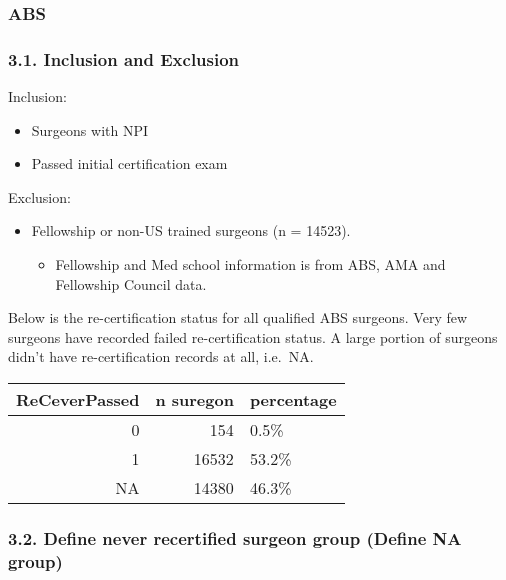 \documentclass[
]{article}
\providecommand{\tightlist}{%
  \setlength{\itemsep}{0pt}\setlength{\parskip}{0pt}}
\begin{document}
\hypertarget{abs}{%
\subsubsection{ABS}\label{abs}}

\hypertarget{inclusion-and-exclusion}{%
\subsubsection{3.1. Inclusion and
Exclusion}\label{inclusion-and-exclusion}}

Inclusion:

\begin{itemize}
\tightlist
\item
  Surgeons with NPI
\item
  Passed initial certification exam
\end{itemize}

Exclusion:

\begin{itemize}
\tightlist
\item
  Fellowship or non-US trained surgeons (n = 14523).

  \begin{itemize}
  \tightlist
  \item
    Fellowship and Med school information is from ABS, AMA and
    Fellowship Council data.
  \end{itemize}
\end{itemize}

Below is the re-certification status for all qualified ABS surgeons.
Very few surgeons have recorded failed re-certification status. A large
portion of surgeons didn't have re-certification records at all,
i.e.~NA.

\begin{table}[H]
\centering
\begin{tabular}{r|r|l}
\hline
ReCeverPassed & n suregon & percentage\\
\hline
0 & 154 & 0.5\%\\
\hline
1 & 16532 & 53.2\%\\
\hline
NA & 14380 & 46.3\%\\
\hline
\end{tabular}
\end{table}

\hypertarget{define-never-recertified-surgeon-group-define-na-group}{%
\subsubsection{3.2. Define never recertified surgeon group (Define NA
group)}\label{define-never-recertified-surgeon-group-define-na-group}}
\end{document}
